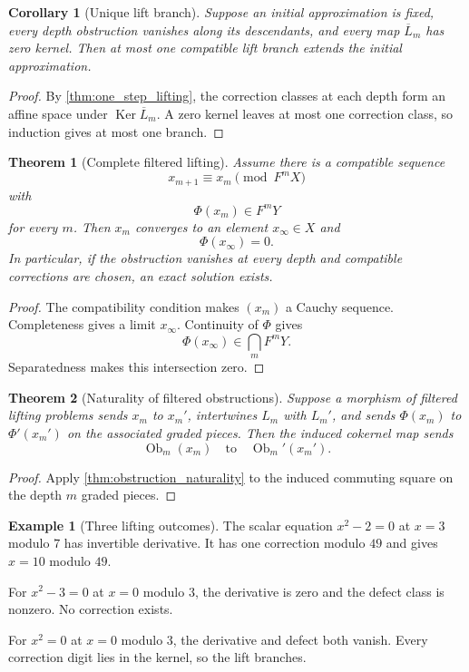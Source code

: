 \documentclass{aomart}
\newtheorem{theorem}{Theorem}[section]
\newtheorem{corollary}[corollary]{Corollary}
\theoremstyle{definition}
\newtheorem{example}[example]{Example}
\theoremstyle{remark}
\newcommand{\Ker}{\operatorname{Ker}}
\newcommand{\Ob}{\operatorname{Ob}}
\begin{document}
\begin{corollary}[Unique lift branch]\label{cor:unique_lift_branch}
Suppose an initial approximation is fixed, every depth obstruction vanishes along its descendants, and every map $\overline L_m$ has zero kernel.  Then at most one compatible lift branch extends the initial approximation.
\end{corollary}

\begin{proof}
By \cref{thm:one_step_lifting}, the correction classes at each depth form an affine space under $\Ker\overline L_m$.  A zero kernel leaves at most one correction class, so induction gives at most one branch.
\end{proof}

\begin{theorem}[Complete filtered lifting]\label{thm:complete_filtered_lifting}
Assume there is a compatible sequence
\[
x_{m+1}\equiv x_m\pmod{F^mX}
\]
with
\[
\Phi(x_m)\in F^mY
\]
for every $m$.  Then $x_m$ converges to an element $x_\infty\in X$ and
\[
\Phi(x_\infty)=0.
\]
In particular, if the obstruction vanishes at every depth and compatible corrections are chosen, an exact solution exists.
\end{theorem}

\begin{proof}
The compatibility condition makes $(x_m)$ a Cauchy sequence.  Completeness gives a limit $x_\infty$.  Continuity of $\Phi$ gives
\[
\Phi(x_\infty)\in\bigcap_mF^mY.
\]
Separatedness makes this intersection zero.
\end{proof}

\begin{theorem}[Naturality of filtered obstructions]\label{thm:filtered_obstruction_naturality}
Suppose a morphism of filtered lifting problems sends $x_m$ to $x_m'$, intertwines $L_m$ with $L_m'$, and sends $\Phi(x_m)$ to $\Phi'(x_m')$ on the associated graded pieces.  Then the induced cokernel map sends
\[
\Ob_m(x_m)
\quad\text{to}\quad
\Ob_m'(x_m').
\]
\end{theorem}

\begin{proof}
Apply \cref{thm:obstruction_naturality} to the induced commuting square on the depth $m$ graded pieces.
\end{proof}

\begin{example}[Three lifting outcomes]\label{ex:three_lifting_outcomes}
The scalar equation $x^2-2=0$ at $x=3$ modulo $7$ has invertible derivative.  It has one correction modulo $49$ and gives $x=10$ modulo $49$.

For $x^2-3=0$ at $x=0$ modulo $3$, the derivative is zero and the defect class is nonzero.  No correction exists.

For $x^2=0$ at $x=0$ modulo $3$, the derivative and defect both vanish.  Every correction digit lies in the kernel, so the lift branches.
\end{example}
\end{document}
